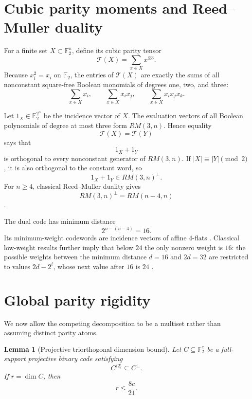 \documentclass[11pt]{article}
\newtheorem{lemma}[theorem]{Lemma}
\theoremstyle{definition}
\newcommand{\F}{\mathbb F}
\begin{document}
\section{Cubic parity moments and Reed--Muller duality}
For a finite set \(X\subset\F_2^n\), define its cubic parity tensor
\[
\mathcal T(X)=\sum_{x\in X}x^{\otimes3}.
\]
Because \(x_i^2=x_i\) on \(\F_2\), the entries of \(\mathcal T(X)\) are exactly the sums of all nonconstant square-free Boolean monomials of degrees one, two, and three:
\[
\sum_{x\in X}x_i,\qquad
\sum_{x\in X}x_ix_j,\qquad
\sum_{x\in X}x_ix_jx_k.
\]

Let \(1_X\in\F_2^{2^n}\) be the incidence vector of \(X\). The evaluation vectors of all Boolean polynomials of degree at most three form \(RM(3,n)\). Hence equality
\[
\mathcal T(X)=\mathcal T(Y)
\]
says that
\[
1_X+1_Y
\]
is orthogonal to every nonconstant generator of \(RM(3,n)\). If \(|X|\equiv|Y|\pmod2\), it is also orthogonal to the constant word, so
\[
1_X+1_Y\in RM(3,n)^\perp.
\]
For \(n\ge4\), classical Reed--Muller duality gives
\[
RM(3,n)^\perp=RM(n-4,n)
\]
\cite{RMTheory2021}.

The dual code has minimum distance
\[
2^{n-(n-4)}=16.
\]
Its minimum-weight codewords are incidence vectors of affine \(4\)-flats \cite{DelsarteNewProof2012}. Classical low-weight results further imply that below \(24\) the only nonzero weight is \(16\): the possible weights between the minimum distance \(d=16\) and \(2d=32\) are restricted to values \(2d-2^i\), whose next value after \(16\) is \(24\) \cite{BerlekampSloane1969,KasamiTokura1970}.

\section{Global parity rigidity}
We now allow the competing decomposition to be a multiset rather than assuming distinct parity atoms.

\begin{lemma}[Projective triorthogonal dimension bound]\label{lem:triobound}
Let \(C\subseteq\F_2^c\) be a full-support projective binary code satisfying
\[
C^{\langle2\rangle}\subseteq C^\perp.
\]
If \(r=\dim C\), then
\[
\boxed{\displaystyle r\le \frac{8c}{21}.}
\]
\end{lemma}
\end{document}
